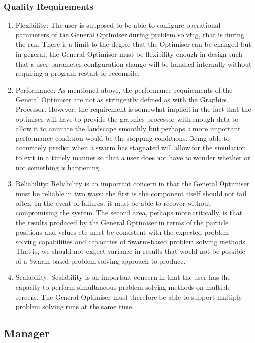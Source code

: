 \documentclass[11pt]{article}
\begin{document}
\subsubsection{Quality Requirements}
\begin{enumerate}
\item Flexibility: The user is supposed to be able to configure operational parameters of the General Optimiser during problem solving, that is during the run. There is a limit to the degree that the Optimiser can be changed but in general, the General Optimiser must be flexibility enough in design such that a user parameter configuration change will be handled internally without requiring a program restart or recompile.
\item Performance: As mentioned above, the performance requirements of the General Optimiser are not as stringently defined as with the Graphics Processor. However, the requirement is somewhat implicit in the fact that the optimiser will have to provide the graphics processor with enough data to allow it to animate the landscape smoothly but perhaps a more important performance condition would be the stopping conditions. Being able to accurately predict when a swarm has stagnated will allow for the simulation to exit in a timely manner so that a user does not have to wonder whether or not something is happening.
\item Reliability: Reliability is an important concern in that the General Optimiser must be reliable in two ways: the first is the component itself should not fail often. In the event of failures, it must be able to recover without compromising the system. The second area, perhaps more critically, is that the results produced by the General Optimiser in terms of the particle positions and values etc must be consistent with the expected problem solving capabilities and capacities of Swarm-based problem solving methods. That is, we should not expect variance in results that would not be possible of a Swarm-based problem solving approach to produce.
\item Scalability: Scalability is an important concern in that the user has the capacity to perform simultaneous problem solving methods on multiple screens. The General Optimiser must therefore be able to support multiple problem solving runs at the same time.
\end{enumerate}
\subsection{Manager}
\end{document}
